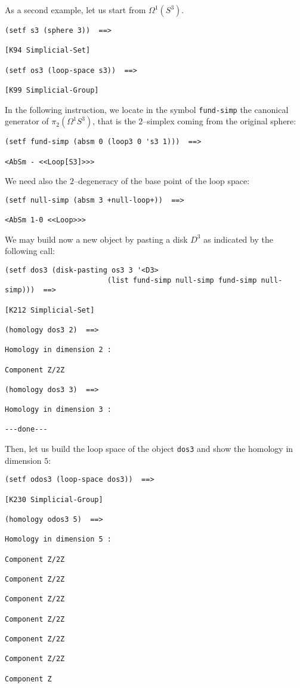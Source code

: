 As a second example, let us start from $\Omega^1(S^3)$.
{\footnotesize\begin{verbatim}
(setf s3 (sphere 3))  ==>

[K94 Simplicial-Set]

(setf os3 (loop-space s3))  ==>

[K99 Simplicial-Group]
\end{verbatim}}
In the following instruction, we locate in the symbol {\tt fund-simp} the canonical generator of
$\pi_2 (\Omega^1S^3)$, that is the $2$--simplex coming from the original sphere:
{\footnotesize\begin{verbatim}
(setf fund-simp (absm 0 (loop3 0 's3 1)))  ==>

<AbSm - <<Loop[S3]>>>
\end{verbatim}}
We need also the $2$--degeneracy of the base point of the loop space:
{\footnotesize\begin{verbatim}
(setf null-simp (absm 3 +null-loop+))  ==>

<AbSm 1-0 <<Loop>>>
\end{verbatim}}
We may  build now a new  object by pasting a disk $D^3$ as indicated by the
following call:
{\footnotesize\begin{verbatim}
(setf dos3 (disk-pasting os3 3 '<D3>
                        (list fund-simp null-simp fund-simp null-simp)))  ==>

[K212 Simplicial-Set]

(homology dos3 2)  ==>

Homology in dimension 2 :

Component Z/2Z

(homology dos3 3)  ==>

Homology in dimension 3 :

---done---
\end{verbatim}}
Then, let us  build the  loop space of the object {\tt dos3} and show the ho\-mo\-lo\-gy
in dimension $5$:
{\footnotesize\begin{verbatim}
(setf odos3 (loop-space dos3))  ==>

[K230 Simplicial-Group]

(homology odos3 5)  ==>

Homology in dimension 5 :

Component Z/2Z

Component Z/2Z

Component Z/2Z

Component Z/2Z

Component Z/2Z

Component Z/2Z

Component Z
\end{verbatim}}

